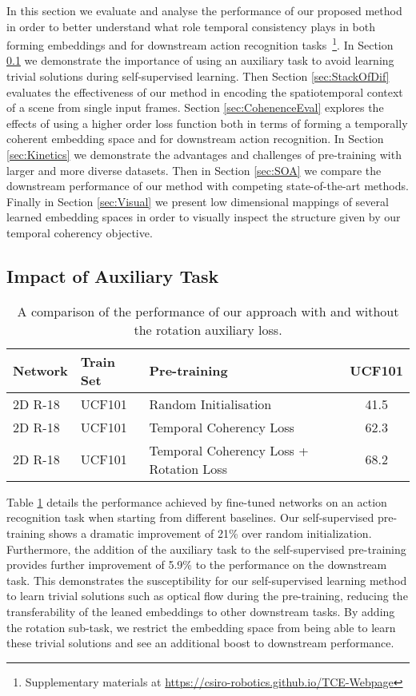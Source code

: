 \documentclass[a4paper,conference]{IEEEtran}
\begin{document}
In this section we evaluate and analyse the performance of our proposed method in order to better understand what role temporal consistency plays in both forming embeddings and for downstream action recognition tasks~\footnote{Supplementary materials at \href{https://csiro-robotics.github.io/TCE-Webpage}{https://csiro-robotics.github.io/TCE-Webpage}}.
In Section \ref{sec:Auxiliary} we demonstrate the importance of using an auxiliary task to avoid learning trivial solutions during self-supervised learning. Then Section \ref{sec:StackOfDif} evaluates the effectiveness of our method in encoding the spatiotemporal context of a scene from single input frames. Section \ref{sec:CohenenceEval} explores the effects of using a higher order loss function both in terms of forming a temporally coherent embedding space and for downstream action recognition. In Section \ref{sec:Kinetics} we demonstrate the advantages and challenges of pre-training with larger and more diverse datasets. Then in Section \ref{sec:SOA} we compare the downstream performance of our method with competing state-of-the-art methods. Finally in Section \ref{sec:Visual} we present low dimensional mappings of several learned embedding spaces in order to visually inspect the structure given by our temporal coherency objective.

\subsection{Impact of Auxiliary Task}
\label{sec:Auxiliary}
\begin{table}
    \caption{A comparison of the performance of our approach with and without the rotation auxiliary loss.}
    \centering 
    \begin{tabular}{llp{3cm}|c}
        \hline \hline 
        \textbf{Network} & \textbf{Train Set} & \textbf{Pre-training} &\textbf{UCF101}\\
        \hline \hline 
        2D R-18 & UCF101 & Random Initialisation & 41.5 \\
        \hline
        2D R-18 & UCF101 & Temporal Coherency Loss & 62.3  \\
        \hline 
        2D R-18 & UCF101 & Temporal Coherency Loss + Rotation Loss & 68.2\\
        \hline 
    \end{tabular}
    \label{tab:init_methods}
\end{table}

Table \ref{tab:init_methods} details the performance achieved by fine-tuned networks on an action recognition task when starting from different baselines. Our self-supervised pre-training shows a dramatic improvement of 21\% over random initialization. Furthermore, the addition of the auxiliary task to the self-supervised pre-training provides further improvement of 5.9\% to the performance on the downstream task. This demonstrates the susceptibility for our self-supervised learning method to learn trivial solutions such as optical flow during the pre-training, reducing the transferability of the leaned embeddings to other downstream tasks. By adding the rotation sub-task, we restrict the embedding space from being able to learn these trivial solutions and see an additional boost to downstream performance.
\end{document}
